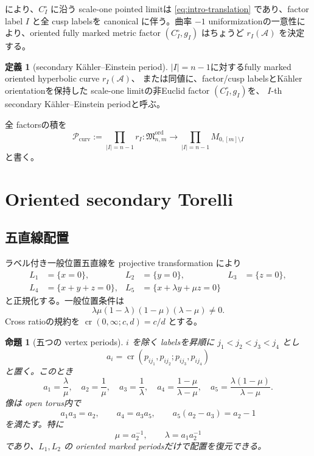 \documentclass[11pt,a4paper]{ltjsarticle}
\newcommand{\cA}{\mathcal A}
\newcommand{\cP}{\mathcal P}
\newcommand{\Mord}{\mathfrak M^{\mathrm{ord}}}
\theoremstyle{plain}
\newtheorem{proposition}[proposition]{命題}
\theoremstyle{definition}
\newtheorem{definition}[definition]{定義}
\theoremstyle{remark}
\begin{document}
 により、$C_I^\circ$ に沿う scale-one pointed limitは \eqref{eq:intro-translation} であり、factor label $I$ と全 cusp labelsを canonical に伴う。曲率 $-1$ uniformizationの一意性により、oriented fully marked metric factor $(C_I^\circ,g_I)$ はちょうど $r_I(\cA)$ を決定する。

\begin{definition}[secondary K\"ahler--Einstein period]
$|I|=n-1$に対するfully marked oriented hyperbolic curve $r_I(\cA)$、
または同値に、factor/cusp labelsとK\"ahler orientationを保持した
scale-one limitの非Euclid factor $(C_I^\circ,g_I)$を、
$I$-th secondary K\"ahler--Einstein periodと呼ぶ。
\end{definition}

全 factorsの積を
\begin{equation}
\label{eq:fullperiod}
 \cP_{\mathrm{curv}}
 :=\prod_{|I|=n-1}r_I:
 \Mord_{n,m}\longrightarrow
 \prod_{|I|=n-1}M_{0,[m]\setminus I}
\end{equation}
と書く。

\section{Oriented secondary Torelli}
\label{sec:oriented}

\subsection{五直線配置}
ラベル付き一般位置五直線を projective transformation により
\begin{align*}
 L_1&=\{x=0\},&L_2&=\{y=0\},&L_3&=\{z=0\},\\
 L_4&=\{x+y+z=0\},&
 L_5&=\{x+\lambda y+\mu z=0\}
\end{align*}
と正規化する。一般位置条件は
\begin{equation}
\label{eq:fivegeneric}
 \lambda\mu(1-\lambda)(1-\mu)(\lambda-\mu)\ne0.
\end{equation}
Cross ratioの規約を $\operatorname{cr}(0,\infty;c,d)=c/d$ とする。

\begin{proposition}[五つの vertex periods]
\label{prop:fiveperiods}
$i$ を除く labelsを昇順に $j_1<j_2<j_3<j_4$ とし
\[
 a_i=\operatorname{cr}(p_{ij_1},p_{ij_2};p_{ij_3},p_{ij_4})
\]
と置く。このとき
\begin{equation}
\label{eq:fiveperiods}
 a_1=\frac{\lambda}{\mu},\quad
 a_2=\frac1\mu,\quad
 a_3=\frac1\lambda,\quad
 a_4=\frac{1-\mu}{\lambda-\mu},\quad
 a_5=\frac{\lambda(1-\mu)}{\lambda-\mu}.
\end{equation}
像は open torus内で
\begin{equation}
\label{eq:five-relations}
 a_1a_3=a_2,
 \qquad a_4=a_3a_5,
 \qquad a_5(a_2-a_3)=a_2-1
\end{equation}
を満たす。特に
\begin{equation}
\label{eq:five-reconstruct}
 \mu=a_2^{-1},\qquad \lambda=a_1a_2^{-1}
\end{equation}
であり、$L_1,L_2$ の oriented marked periodsだけで配置を復元できる。
\end{proposition}
\end{document}
